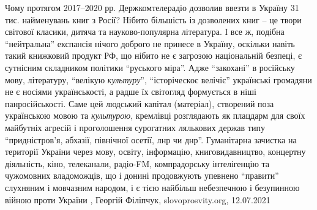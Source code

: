 Чому протягом 2017–2020 рр. Держкомтелерадіо дозволив ввезти в Україну 31 тис.
найменувань книг з Росії? Нібито більшість із дозволених книг – це твори
світової класики, дитяча та науково-популярна література. І все ж, подібна
\enquote{нейтральна} експансія нічого доброго не принесе в Україну, оскільки навіть
такий книжковий продукт РФ, що нібито не є загрозою національній безпеці, є
сутнісним складником політики \enquote{руського міра}. Адже \enquote{закохані} в російську
мову, літературу, \enquote{велікую \emph{культуру}}, \enquote{історіческоє велічіє} українські
громадяни не є носіями українськості, а радше їх світогляд формується в ніші
панросійськості. Саме цей людський капітал (матеріал), створений поза
українською мовою та \emph{культурою}, кремлівці розглядають як плацдарм для своїх
майбутніх агресій і проголошення сурогатних лялькових держав типу
\enquote{придністров’я, абхазії, північної осетії, лнр чи днр}. Гуманітарна зачистка на
території України через мову, освіту, інформацію, книговидавництво, концертну
діяльність, кіно, телеканали, радіо-FM, компрадорську інтелігенцію та
чужомовних владоможців, що і донині продовжують упевнено \enquote{правити} слухняним і
мовчазним народом, і є тією найбільш небезпечною і безупинною війною проти
України
, Георгій Філіпчук, slovoprosvity.org, 12.07.2021

